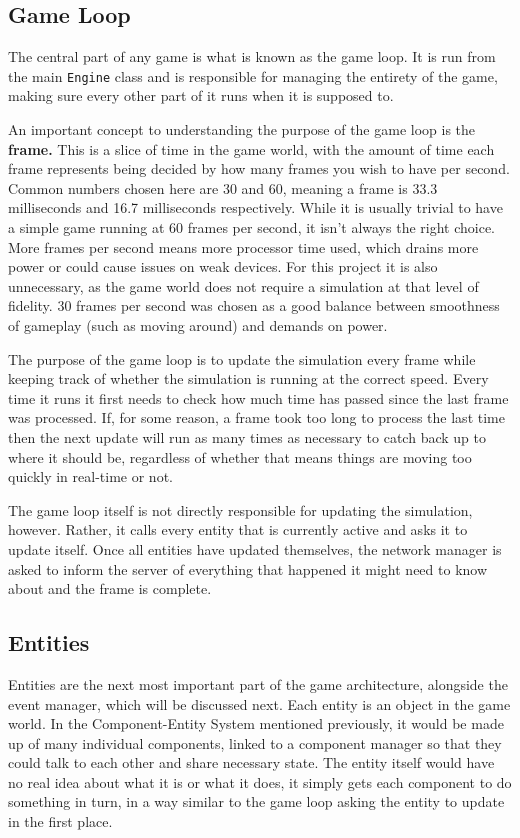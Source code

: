 \subsection{Game Loop}
The central part of any game is what is known as the game loop. It is run from the main \texttt{Engine} class and is responsible for managing the entirety of the game, making sure every other part of it runs when it is supposed to.

An important concept to understanding the purpose of the game loop is the \textbf{frame.} This is a slice of time in the game world, with the amount of time each frame represents being decided by how many frames you wish to have per second. Common numbers chosen here are 30 and 60, meaning a frame is 33.3 milliseconds and 16.7 milliseconds respectively. While it is usually trivial to have a simple game running at 60 frames per second, it isn't always the right choice. More frames per second means more processor time used, which drains more power or could cause issues on weak devices. For this project it is also unnecessary, as the game world does not require a simulation at that level of fidelity. 30 frames per second was chosen as a good balance between smoothness of gameplay (such as moving around) and demands on power.

The purpose of the game loop is to update the simulation every frame while keeping track of whether the simulation is running at the correct speed. Every time it runs it first needs to check how much time has passed since the last frame was processed. If, for some reason, a frame took too long to process the last time then the next update will run as many times as necessary to catch back up to where it should be, regardless of whether that means things are moving too quickly in real-time or not.

The game loop itself is not directly responsible for updating the simulation, however. Rather, it calls every entity that is currently active and asks it to update itself. Once all entities have updated themselves, the network manager is asked to inform the server of everything that happened it might need to know about and the frame is complete.

\subsection{Entities}
Entities are the next most important part of the game architecture, alongside the event manager, which will be discussed next. Each entity is an object in the game world. In the Component-Entity System mentioned previously, it would be made up of many individual components, linked to a component manager so that they could talk to each other and share necessary state. The entity itself would have no real idea about what it is or what it does, it simply gets each component to do something in turn, in a way similar to the game loop asking the entity to update in the first place.

